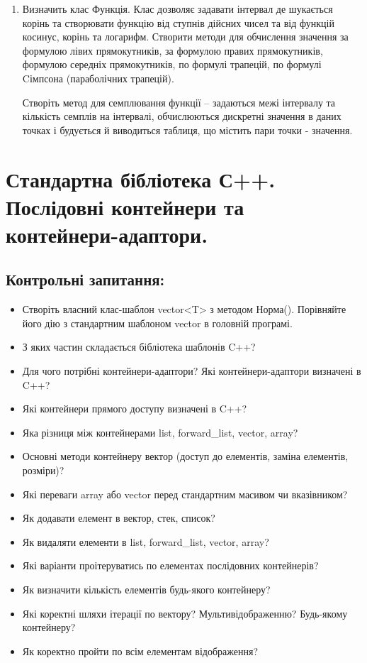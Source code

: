\documentclass[a5paper,titlepage,openany,twoside,
]
{book_unv}%
\begin{document}
\begin{enumerate}
\item
Визначить клас Функція. Клас дозволяє задавати інтервал де шукається корінь та створювати функцію
від ступнів дійсних чисел та від функцій косинус, корінь та логарифм.
Створити методи для обчислення значення за формулою лівих прямокутників,
за формулою правих прямокутників, формулою середніх прямокутників,
по формулі трапецій, по формулі Cімпсона (параболічних трапецій).

Створіть метод для семплювання функції -- задаються межі інтервалу та кількість
семплів на інтервалі, обчислюються дискретні значення в даних точках і будується
 й виводиться таблиця, що містить пари точки - значення.

\end{enumerate}


\chapter{Стандартна бібліотека С++. Послідовні контейнери та контейнери-адаптори.}
%

\section{Контрольні запитання:}
\begin{itemize}
\item
  Створіть власний клас-шаблон vector\textless{}T\textgreater{} з
  методом Норма(). Порівняйте його дію з стандартним шаблоном vector в
  головній програмі.
\item
  З яких частин складається бібліотека шаблонів C++?
\item
  Для чого потрібні контейнери-адаптори? Які контейнери-адаптори
  визначені в C++?
\item
  Які контейнери прямого доступу визначені в C++?
\item
  Яка різниця між контейнерами list, forward\_list, vector, array?
\item
  Основні методи контейнеру вектор (доступ до елементів, заміна
  елементів, розміри)?
\item
  Які переваги array або vector перед стандартним масивом чи
  вказівником?
\item
  Як додавати елемент в вектор, стек, список?
\item
  Як видаляти елементи в list, forward\_list, vector, array?
\item
  Які варіанти проітеруватись по елементах послідовних контейнерів?

\item
Як визначити кількість елементів будь-якого контейнеру?
\item
Які коректні шляхи ітерації по вектору? Мультивідображенню? Будь-якому
контейнеру?
\item
Як коректно пройти по всім елементам відображення?

\end{itemize}
\end{document}
